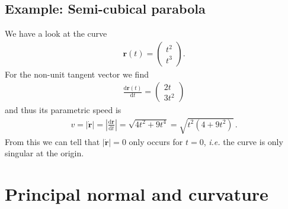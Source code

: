\documentclass[11pt, DINA4, fleqn]{amsart}
\def\df{\mathrm{d}\xspace}
\newcommand{\dd}[2]{\frac{\df#1}{\df#2}}
\def\vr{\boldsymbol{r}\xspace}
\def\vrd{\dot{\vr}\xspace}
\begin{document}
\subsection{Example: Semi-cubical parabola}
We have a look at the curve
\begin{align}
\vr(t) = \begin{pmatrix}
t^2 \\ t^3
\end{pmatrix}.
\end{align}
For the non-unit tangent vector we find
\begin{align}
\dd{\vr(t)}{t} = \begin{pmatrix}
2t \\ 3t^2
\end{pmatrix}
\end{align}
and thus its parametric speed is
\begin{align}
v = |\vrd| = \left|\dd{\vr}{t}\right| = \sqrt{4t^2 + 9t^4} = \sqrt{t^2(4+9t^2)} \, .
\end{align}
From this we can tell that $|\vrd| = 0$ only occurs for $t=0$, \textit{i.e.} the curve is only singular at the origin.

\section{Principal normal and curvature}
\end{document}
